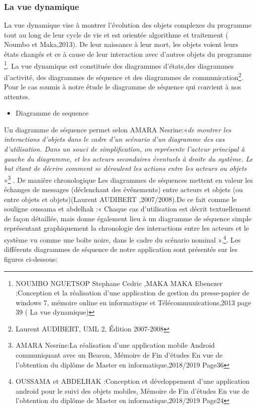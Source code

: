 \documentclass[a4paper, 12pt]{article}
\begin{document}
\subsubsection{La vue dynamique}
\quad La vue dynamique vise à montrer l’évolution des objets complexes du programme tout au long de leur cycle de vie et est orientée algorithme et traitement ( Noumbo et Maka,2013). De leur naissance à leur mort, les objets voient leurs états changés et ce à cause de leur interaction avec d’autres objets du programme \footnote{NOUMBO NGUETSOP Stephane Cedric ,MAKA MAKA Ebenezer :Conception et la réalisation d'une application de gestion du presse-papier de windows 7, mémoire  online en informatique et Télécommunications,2013 page 39 ( La vue dynamique)}. La vue dynamique est constituée des diagrammes d’états,des diagrammes d’activité, des diagrammes de séquence et des diagrammes de communication\footnote{ Laurent AUDIBERT, UML 2, Édition 2007-2008}. Pour le  cas soumis à notre étude le diagramme de séquence qui convient à nos attentes. \\ 



\begin{itemize}
\item Diagramme de sequence
\end{itemize}

\quad Un diagramme de séquence permet selon AMARA Nesrine:«\textit{de montrer les interactions d'objets dans le cadre d'un scénario d'un diagramme des cas d'utilisation. Dans un souci de simplification, on représente l'acteur principal à gauche du diagramme, et les acteurs secondaires éventuels à droite du système. Le but étant de décrire comment se déroulent les actions entre les acteurs ou objets } »\footnote{AMARA Nesrine:La réalisation d’une application mobile Android communiquant avec un Beacon, Mémoire de Fin d’études En vue de l’obtention du diplôme de Master en informatique,2018/2019 Page36} . De manière chronologique Les diagrammes de séquences mettent en valeur les échanges de messages (déclenchant des événements) entre acteurs et objets (ou entre objets et objets)(Laurent AUDIBERT ,2007/2008).De ce fait comme le souligne oussama et abdelhak :« Chaque cas d’utilisation est décrit textuellement de façon détaillée, mais donne également lieu à un diagramme de séquence simple représentant graphiquement la chronologie des interactions entre les acteurs et le système vu comme une boîte noire, dans le cadre du scénario nominal ».\footnote{OUSSAMA et ABDELHAK :Conception et développement d’une application android pour le suivi des objets mobiles, Mémoire de Fin d’études En vue de l’obtention du diplôme de Master en informatique,2018/2019 Page24}. Les différents diagrammes de séquence de notre application sont présentés sur les figures ci-dessous:
\end{document}
